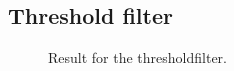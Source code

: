 \documentclass[titlepage, a4paper]{article}
\begin{document}
\subsection{Threshold filter}

\begin{figure}[H]
  \centering
  \caption{Result for the thresholdfilter.}
  \label{fig:threshold}
\end{figure}
\end{document}
